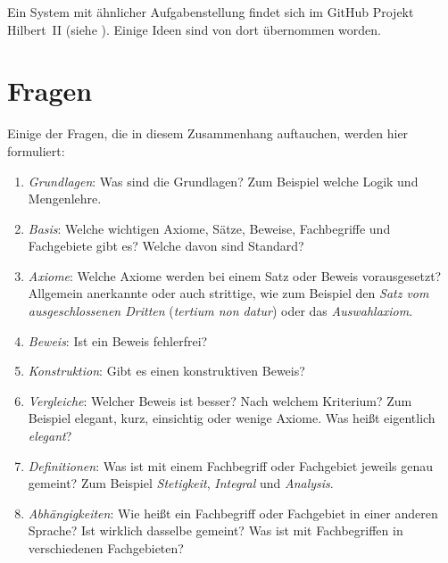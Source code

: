 \documentclass[english,ngerman,parskip=half,headsepline,footsepline]{scrreprt}
\begin{document}
	Ein System mit ähnlicher Aufgabenstellung findet sich im GitHub Projekt Hilbert~II (siehe \cite{bib:HilbertII,bib:qedeq}). Einige Ideen sind von dort übernommen worden.
	
	\section{Fragen}
	\label{sec:Fragen}
	Einige der Fragen, die in diesem Zusammenhang auftauchen, werden hier formuliert:
	
	\begin{enumerate}
		
		\item \label{Frage:Grundlagen} \emph{Grundlagen}: Was sind die Grundlagen? Zum Beispiel welche Logik und Mengenlehre.
		
		\item \label{Frage:Basis} \emph{Basis}: Welche wichtigen Axiome, Sätze, Beweise, Fachbegriffe und Fachgebiete gibt es? Welche davon sind Standard?
		
		\item \label{Frage:Axiome} \emph{Axiome}: Welche Axiome werden bei einem Satz oder Beweis vorausgesetzt? Allgemein anerkannte oder auch strittige, wie zum Beispiel den \emph{Satz vom ausgeschlossenen Dritten} (\emph{tertium non datur}) oder das \emph{Auswahlaxiom}.
		
		\item \label{Frage:Beweis} \emph{Beweis}: Ist ein Beweis fehlerfrei?
		
		\item \label{Frage:Konstruktion} \emph{Konstruktion}: Gibt es einen konstruktiven Beweis?
		
		\item \label{Frage:Vergleiche} \emph{Vergleiche}: Welcher Beweis ist besser? Nach welchem Kriterium? Zum Beispiel elegant, kurz, einsichtig oder wenige Axiome. Was heißt eigentlich \emph{elegant}?
		
		\item \label{Frage:Definitionen} \emph{Definitionen}: Was ist mit einem Fachbegriff oder Fachgebiet jeweils genau gemeint? Zum Beispiel \emph{Stetigkeit}, \emph{Integral} und \emph{Analysis}.
		
		\item \label{Frage:Abhängigkeiten} \emph{Abhängigkeiten}: Wie heißt ein Fachbegriff oder Fachgebiet in einer anderen Sprache? Ist wirklich dasselbe gemeint? Was ist mit Fachbegriffen in verschiedenen Fachgebieten?
		

\end{enumerate}
\end{document}
